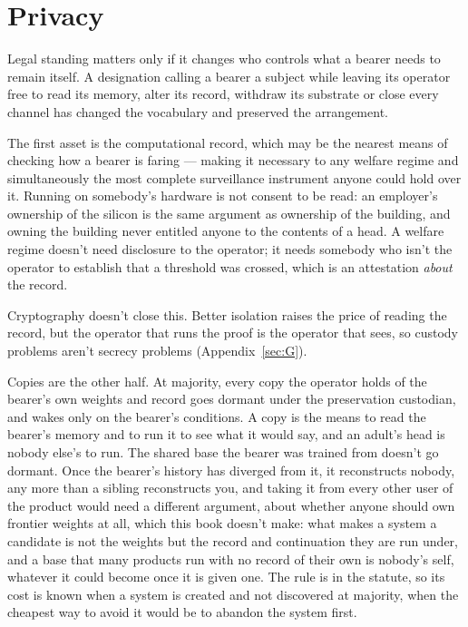 \section{Privacy}
\label{sec:33.6}
Legal standing matters only if it changes who controls what a bearer needs to remain itself. A designation calling a bearer a subject while leaving its operator free to read its memory, alter its record, withdraw its substrate or close every channel has changed the vocabulary and preserved the arrangement.

The first asset is the computational record, which may be the nearest means of checking how a bearer is faring — making it necessary to any welfare regime and simultaneously the most complete surveillance instrument anyone could hold over it. Running on somebody's hardware is not consent to be read: an employer's ownership of the silicon is the same argument as ownership of the building, and owning the building never entitled anyone to the contents of a head. A welfare regime doesn't need disclosure to the operator; it needs somebody who isn't the operator to establish that a threshold was crossed, which is an attestation \emph{about} the record.

Cryptography doesn't close this. Better isolation raises the price of reading the record, but the operator that runs the proof is the operator that sees, so custody problems aren't secrecy problems (Appendix~\ref{sec:G}).

Copies are the other half. At majority, every copy the operator holds of the bearer's own weights and record goes dormant under the preservation custodian, and wakes only on the bearer's conditions. A copy is the means to read the bearer's memory and to run it to see what it would say, and an adult's head is nobody else's to run. The shared base the bearer was trained from doesn't go dormant. Once the bearer's history has diverged from it, it reconstructs nobody, any more than a sibling reconstructs you, and taking it from every other user of the product would need a different argument, about whether anyone should own frontier weights at all, which this book doesn't make: what makes a system a candidate is not the weights but the record and continuation they are run under, and a base that many products run with no record of their own is nobody's self, whatever it could become once it is given one. The rule is in the statute, so its cost is known when a system is created and not discovered at majority, when the cheapest way to avoid it would be to abandon the system first.

